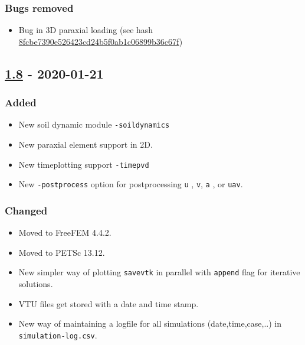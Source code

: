 \subsubsection{Bugs removed}\label{bugs-removed-1}

\begin{itemize}
\tightlist
\item
  Bug in 3D paraxial loading (see hash
  \href{https://codev-tuleap.intra.cea.fr/plugins/git/hpcseism/freefem?a=blobdiff\&h=f23846d41b3eee27b9f2c3b852b9c5e2f90080c5\&hp=0af4cfcc1355b98cc09a94e42c8ec521c6c0bb00\&hb=8fcbe7390e526423cd24b5f0ab1c06899b36c67f\&f=src\%2Fpsd-preprocessor\%2FMacros.hpp}{8fcbe7390e526423cd24b5f0ab1c06899b36c67f})
\end{itemize}

\subsection{\texorpdfstring{\href{https://gitlab.com/PsdSolver/psd_sources/-/tree/v1.8}{1.8}
- 2020-01-21}{1.8 - 2020-01-21}}\label{section-3}

\subsubsection{Added}\label{added-4}

\begin{itemize}
\tightlist
\item
  New soil dynamic module \lstinline!-soildynamics!
\item
  New paraxial element support in 2D.
\item
  New timeplotting support \lstinline!-timepvd!
\item
  New \lstinline!-postprocess! option for postprocessing \lstinline!u! ,
  \lstinline!v!, \lstinline!a! , or \lstinline!uav!.
\end{itemize}

\subsubsection{Changed}\label{changed-4}

\begin{itemize}
\tightlist
\item
  Moved to FreeFEM 4.4.2.
\item
  Moved to PETSc 13.12.
\item
  New simpler way of plotting \lstinline!savevtk! in parallel with
  \lstinline!append! flag for iterative solutions.
\item
  VTU files get stored with a date and time stamp.
\item
  New way of maintaining a logfile for all simulations
  (date,time,case,..) in \lstinline!simulation-log.csv!.
\end{itemize}

